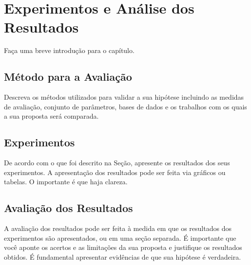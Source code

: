 \chapter[Experimentos e Análise dos Resultados]{Experimentos e Análise dos Resultados}
\label{experimentos}

Faça uma breve introdução para o capítulo.

\section{Método para a Avaliação}
\label{metodo}
Descreva os métodos utilizados para validar a sua hipótese incluindo as medidas de avaliação, conjunto de parâmetros, bases de dados e os trabalhos com os quais a sua proposta será comparada.

\section{Experimentos}
De acordo com o que foi descrito na Seção, apresente os resultados dos seus experimentos. A apresentação dos resultados pode ser feita via gráficos ou tabelas. O importante é que haja clareza.


\section{Avaliação dos Resultados}
\label{avaliacao}

A avaliação dos resultados pode ser feita à medida em que os resultados dos experimentos são apresentados, ou em uma seção separada. É importante que você aponte os acertos e as limitações da sua proposta e justifique os resultados obtidos. É fundamental apresentar evidências de que sua hipótese é verdadeira.